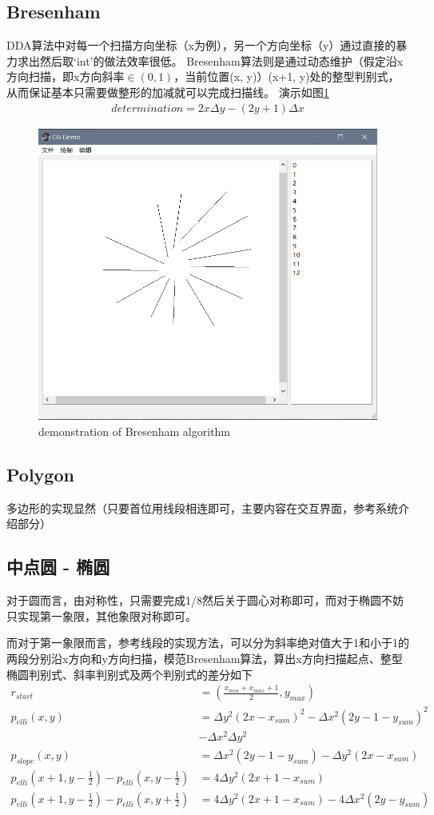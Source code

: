 \documentclass[a4paper,UTF8]{article}
\theoremstyle{definition}
\begin{document}
\subsection{Bresenham}
DDA算法中对每一个扫描方向坐标（x为例），另一个方向坐标（y）通过直接的暴力求出然后取‘int'的做法效率很低。
Bresenham算法则是通过动态维护（假定沿x方向扫描，即x方向斜率$\in (0, 1)$，当前位置(x, y)）(x+1, y)处的整型判别式，从而保证基本只需要做整形的加减就可以完成扫描线。
演示如图\ref{fig3}
$$
\begin{aligned}
    determination = 2x\Delta y - (2y+1)\Delta x
\end{aligned}
$$
\begin{figure}[h]
    \centering
    \includegraphics[width = .5\textwidth]{./source/pics/alg_bresenham.PNG}
    \caption{demonstration of Bresenham algorithm}
    \label{fig3}
\end{figure}

\subsection{Polygon}
多边形的实现显然（只要首位用线段相连即可，主要内容在交互界面，参考系统介绍部分）

\subsection{中点圆 - 椭圆}
对于圆而言，由对称性，只需要完成1/8然后关于圆心对称即可，而对于椭圆不妨只实现第一象限，其他象限对称即可。
\par
而对于第一象限而言，参考线段的实现方法，可以分为斜率绝对值大于1和小于1的两段分别沿x方向和y方向扫描，模范Bresenham算法，算出x方向扫描起点、整型椭圆判别式、斜率判别式及两个判别式的差分如下
$$
\begin{aligned}
    r_{start} &= ( \frac{x_{min} + x_{max} + 1}{2} , y_{max})\\
    p_{elli}(x, y) &= \Delta y^2 (2x - x_{sum})^2 - \Delta x^2 (2y-1-y_{sum})^2 \\
                & - \Delta x^2 \Delta y^2\\
    p_{slope}(x, y) &= \Delta x^2(2y-1-y_{sum}) - \Delta y^2(2x - x_{sum})\\
    p_{elli}(x+1, y-\frac{1}{2}) - p_{elli}(x, y-\frac{1}{2}) &= 4\Delta y^2(2x+1 -x_{sum})\\
    p_{elli}(x+1, y-\frac{1}{2}) - p_{elli}(x, y+\frac{1}{2}) &= 4\Delta y^2(2x+1 -x_{sum}) - 4\Delta x^2(2y -y_{sum})
\end{aligned}
$$
\par
\end{document}
